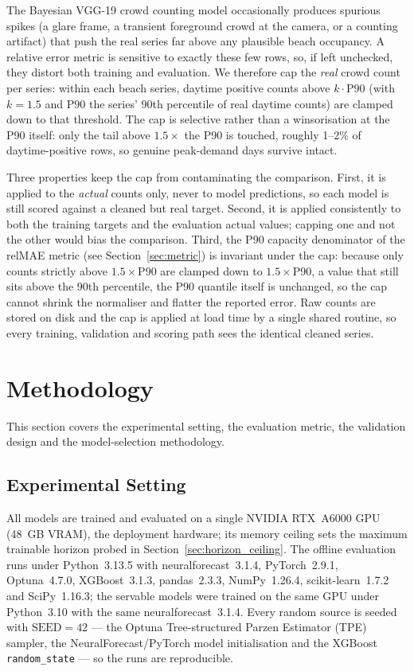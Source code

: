 \documentclass[twocolumn,twoside,a4paper,10pt]{IEEEtran}
\begin{document}
The Bayesian VGG-19 crowd counting model occasionally produces spurious spikes (a glare frame, a transient foreground crowd at the camera, or a counting artifact) that push the real series far above any plausible beach occupancy. A relative error metric is sensitive to exactly these few rows, so, if left unchecked, they distort both training and evaluation. We therefore cap the \emph{real} crowd count per series: within each beach series, daytime positive counts above $k\cdot\mathrm{P90}$ (with $k=1.5$ and $\mathrm{P90}$ the series' 90th percentile of real daytime counts) are clamped down to that threshold. The cap is selective rather than a winsorisation at the P90 itself: only the tail above $1.5\times$ the P90 is touched, roughly 1--2\% of daytime-positive rows, so genuine peak-demand days survive intact.

Three properties keep the cap from contaminating the comparison. First, it is applied to the \emph{actual} counts only, never to model predictions, so each model is still scored against a cleaned but real target. Second, it is applied consistently to both the training targets and the evaluation actual values; capping one and not the other would bias the comparison. Third, the P90 capacity denominator of the relMAE metric (see Section~\ref{sec:metric}) is invariant under the cap: because only counts strictly above $1.5\times$P90 are clamped down to $1.5\times$P90, a value that still sits above the 90th percentile, the P90 quantile itself is unchanged, so the cap cannot shrink the normaliser and flatter the reported error. Raw counts are stored on disk and the cap is applied at load time by a single shared routine, so every training, validation and scoring path sees the identical cleaned series.

\section{Methodology}\label{sec:method}

This section covers the experimental setting, the evaluation metric, the validation design and the model-selection methodology.

\subsection{Experimental Setting}\label{sec:setup}

All models are trained and evaluated on a single NVIDIA RTX~A6000 GPU (48~GB VRAM), the deployment hardware; its memory ceiling sets the maximum trainable horizon probed in Section~\ref{sec:horizon_ceiling}. The offline evaluation runs under Python~3.13.5 with neuralforecast~3.1.4, PyTorch~2.9.1, Optuna~4.7.0, XGBoost~3.1.3, pandas~2.3.3, NumPy~1.26.4, scikit-learn~1.7.2 and SciPy~1.16.3; the servable models were trained on the same GPU under Python~3.10 with the same neuralforecast~3.1.4. Every random source is seeded with $\text{SEED}=42$ --- the Optuna Tree-structured Parzen Estimator (TPE) sampler, the NeuralForecast/PyTorch model initialisation and the XGBoost \texttt{random\_state} --- so the runs are reproducible.
\end{document}
